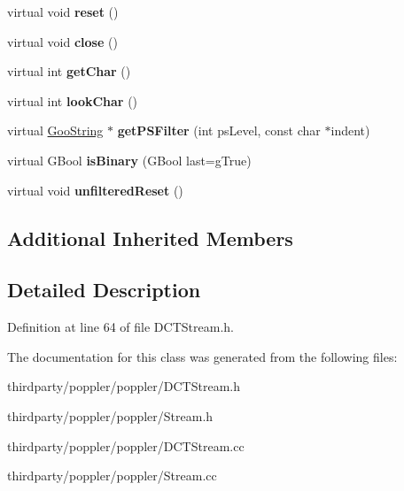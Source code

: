 \begin{DoxyCompactItemize}
\item 
\mbox{\label{class_d_c_t_stream_ad0eedaddbadf6dfb2ef9f6f8caf99498}} 
virtual void {\bfseries reset} ()
\item 
\mbox{\label{class_d_c_t_stream_a5259e215eac638605f616db81e3f6f20}} 
virtual void {\bfseries close} ()
\item 
\mbox{\label{class_d_c_t_stream_aeb1cae054fc012b5f711e574f2abbd98}} 
virtual int {\bfseries get\+Char} ()
\item 
\mbox{\label{class_d_c_t_stream_a456e578a0aa092eeeb15357b39318b16}} 
virtual int {\bfseries look\+Char} ()
\item 
\mbox{\label{class_d_c_t_stream_af15b34eede75e582702eccd7b1bdc011}} 
virtual \hyperlink{class_goo_string}{Goo\+String} $\ast$ {\bfseries get\+P\+S\+Filter} (int ps\+Level, const char $\ast$indent)
\item 
\mbox{\label{class_d_c_t_stream_a6cf11668bf72fdfef97b3aa5f948d9a8}} 
virtual G\+Bool {\bfseries is\+Binary} (G\+Bool last=g\+True)
\item 
\mbox{\label{class_d_c_t_stream_a2b146d065698a4dd5be232700c1f6e93}} 
virtual void {\bfseries unfiltered\+Reset} ()
\end{DoxyCompactItemize}
\subsection*{Additional Inherited Members}


\subsection{Detailed Description}


Definition at line 64 of file D\+C\+T\+Stream.\+h.



The documentation for this class was generated from the following files\+:\begin{DoxyCompactItemize}
\item 
thirdparty/poppler/poppler/D\+C\+T\+Stream.\+h\item 
thirdparty/poppler/poppler/Stream.\+h\item 
thirdparty/poppler/poppler/D\+C\+T\+Stream.\+cc\item 
thirdparty/poppler/poppler/Stream.\+cc\end{DoxyCompactItemize}
